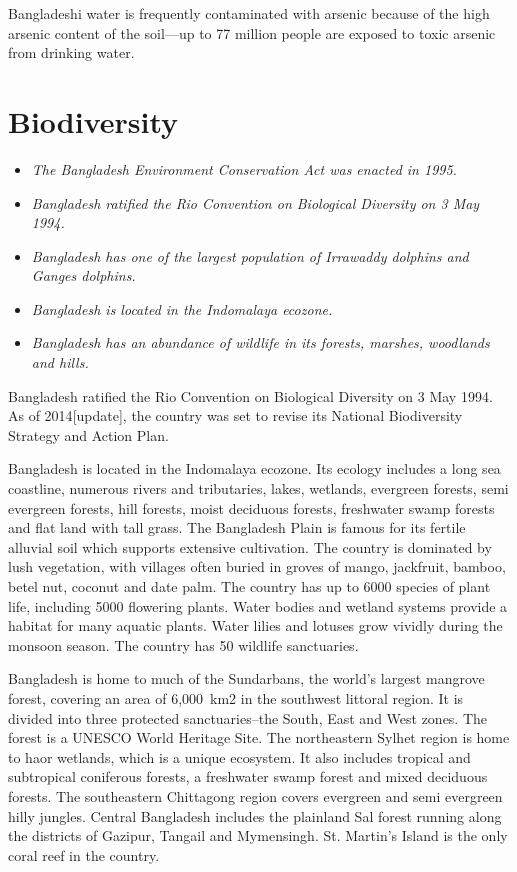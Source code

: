 Bangladeshi water is frequently contaminated with arsenic because of the
high arsenic content of the soil---up to 77 million people are exposed
to toxic arsenic from drinking water.

\section{Biodiversity}\label{biodiversity}

\begin{itemize}
\item
  \emph{The Bangladesh Environment Conservation Act was enacted in
  1995.}
\item
  \emph{Bangladesh ratified the Rio Convention on Biological Diversity
  on 3 May 1994.}
\item
  \emph{Bangladesh has one of the largest population of Irrawaddy
  dolphins and Ganges dolphins.}
\item
  \emph{Bangladesh is located in the Indomalaya ecozone.}
\item
  \emph{Bangladesh has an abundance of wildlife in its forests, marshes,
  woodlands and hills.}
\end{itemize}

Bangladesh ratified the Rio Convention on Biological Diversity on 3 May
1994. As of 2014{[}update{]}, the country was set to revise its National
Biodiversity Strategy and Action Plan.

Bangladesh is located in the Indomalaya ecozone. Its ecology includes a
long sea coastline, numerous rivers and tributaries, lakes, wetlands,
evergreen forests, semi evergreen forests, hill forests, moist deciduous
forests, freshwater swamp forests and flat land with tall grass. The
Bangladesh Plain is famous for its fertile alluvial soil which supports
extensive cultivation. The country is dominated by lush vegetation, with
villages often buried in groves of mango, jackfruit, bamboo, betel nut,
coconut and date palm. The country has up to 6000 species of plant life,
including 5000 flowering plants. Water bodies and wetland systems
provide a habitat for many aquatic plants. Water lilies and lotuses grow
vividly during the monsoon season. The country has 50 wildlife
sanctuaries.

Bangladesh is home to much of the Sundarbans, the world's largest
mangrove forest, covering an area of 6,000~km2 in the southwest littoral
region. It is divided into three protected sanctuaries--the South, East
and West zones. The forest is a UNESCO World Heritage Site. The
northeastern Sylhet region is home to haor wetlands, which is a unique
ecosystem. It also includes tropical and subtropical coniferous forests,
a freshwater swamp forest and mixed deciduous forests. The southeastern
Chittagong region covers evergreen and semi evergreen hilly jungles.
Central Bangladesh includes the plainland Sal forest running along the
districts of Gazipur, Tangail and Mymensingh. St. Martin's Island is the
only coral reef in the country.

